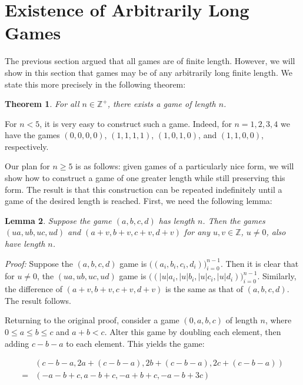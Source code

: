 \documentclass[12pt]{amsart}
\newtheorem{theorem}{Theorem}[section]
\newtheorem{lemma}[theorem]{Lemma}
\newcommand{\zp}{\mathbb{Z}^+}
\begin{document}
\section{Existence of Arbitrarily Long Games\label{sec:longgames}}

The previous section argued that all games are of finite length. However, we will show in this section that games may be of any arbitrarily long finite length. We state this more precisely in the following theorem:

\begin{theorem}
For all $n\in \zp$, there exists a game of length $n$.
\end{theorem}

For $n < 5$, it is very easy to construct such a game. Indeed, for $n=1,2,3,4$ we have the games $(0, 0, 0, 0)$, $(1, 1, 1, 1)$, $(1, 0, 1, 0)$, and $(1, 1, 0, 0)$, respectively.

Our plan for $n \geq 5$ is as follows: given games of a particularly nice form, we will show how to construct a game of one greater length while still preserving this form. The result is that this construction can be repeated indefinitely until a game of the desired length is reached. First, we need the following lemma:

\begin{lemma}
Suppose the game $(a, b, c, d)$ has length $n$. Then the games $(ua, ub, uc, ud)$ and $(a + v, b + v, c + v, d + v)$ for any $u, v\in \mathbb{Z}$, $u\neq 0$, also have length $n$.
\end{lemma}

\textit{Proof:} Suppose the $(a, b, c, d)$ game is $\Big((a_i, b_i, c_i, d_i)\Big)_{i=0}^{n - 1}$. Then it is clear that for $u\neq 0$, the $(ua, ub, uc, ud)$ game is $\Big((|u|a_i, |u|b_i, |u|c_i, |u|d_i)\Big)_{i=0}^{n - 1}$. Similarly, the difference of $(a + v, b + v, c + v, d + v)$ is the same as that of $(a, b, c, d)$. The result follows.

Returning to the original proof, consider a game $(0, a, b, c)$ of length $n$, where $0\leq a\leq b\leq c$ and $a + b < c$. Alter this game by doubling each element, then adding $c - b - a$ to each element. This yields the game:

$$\begin{array}{cl}
& (c - b - a, 2a + (c - b - a), 2b + (c - b - a), 2c + (c - b - a)) \\
= & (-a - b + c, a - b + c, -a + b + c, -a - b + 3c)
\end{array}$$
\end{document}
